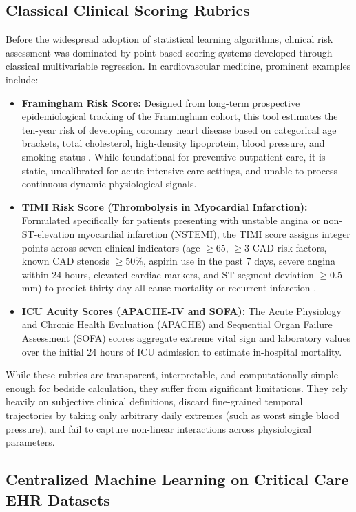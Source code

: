 \subsection{Classical Clinical Scoring Rubrics}
\label{subsec:clinical_scoring}

Before the widespread adoption of statistical learning algorithms, clinical risk assessment was dominated by point-based scoring systems developed through classical multivariable regression. In cardiovascular medicine, prominent examples include:
\begin{itemize}
    \item \textbf{Framingham Risk Score:} Designed from long-term prospective epidemiological tracking of the Framingham cohort, this tool estimates the ten-year risk of developing coronary heart disease based on categorical age brackets, total cholesterol, high-density lipoprotein, blood pressure, and smoking status \citep{krumholz2018cardiovascular}. While foundational for preventive outpatient care, it is static, uncalibrated for acute intensive care settings, and unable to process continuous dynamic physiological signals.
    \item \textbf{TIMI Risk Score (Thrombolysis in Myocardial Infarction):} Formulated specifically for patients presenting with unstable angina or non-ST-elevation myocardial infarction (NSTEMI), the TIMI score assigns integer points across seven clinical indicators (age $\ge 65$, $\ge 3$ CAD risk factors, known CAD stenosis $\ge 50\%$, aspirin use in the past 7 days, severe angina within 24 hours, elevated cardiac markers, and ST-segment deviation $\ge 0.5$ mm) to predict thirty-day all-cause mortality or recurrent infarction \citep{antman2000timi}.
    \item \textbf{ICU Acuity Scores (APACHE-IV and SOFA):} The Acute Physiology and Chronic Health Evaluation (APACHE) and Sequential Organ Failure Assessment (SOFA) scores aggregate extreme vital sign and laboratory values over the initial 24 hours of ICU admission to estimate in-hospital mortality.
\end{itemize}
While these rubrics are transparent, interpretable, and computationally simple enough for bedside calculation, they suffer from significant limitations. They rely heavily on subjective clinical definitions, discard fine-grained temporal trajectories by taking only arbitrary daily extremes (such as worst single blood pressure), and fail to capture non-linear interactions across physiological parameters.

\subsection{Centralized Machine Learning on Critical Care EHR Datasets}
\label{subsec:centralized_ml_ehr}

